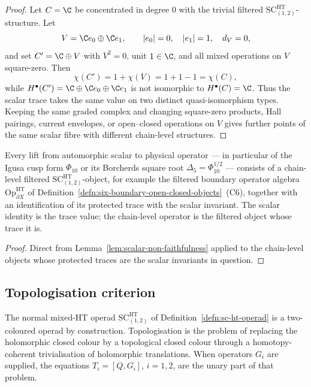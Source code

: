 \begin{proof}
Let \(C=\C\) be concentrated in degree \(0\) with the trivial filtered
\(\mathrm{SC}^{\mathrm{HT}}_{(1,2)}\)-structure.  Let
\[
  V=\C e_0\oplus \C e_1,\qquad |e_0|=0,\quad |e_1|=1,\quad d_V=0,
\]
and set \(C'=\C\oplus V\) with \(V^2=0\), unit \(1\in\C\), and all
mixed operations on \(V\) square-zero.  Then
\[
  \chi(C')=1+\chi(V)=1+1-1=\chi(C),
\]
while \(H^\bullet(C')=\C\oplus \C e_0\oplus \C e_1\) is not
isomorphic to \(H^\bullet(C)=\C\).  Thus the scalar trace takes the
same value on two distinct quasi-isomorphism types.  Keeping the same graded
complex and changing square-zero products, Hall pairings, current
envelopes, or open--closed operations on \(V\) gives further points of
the same scalar fibre with different chain-level structures.
\end{proof}

\begin{cor}
\label{cor:mandatory-chain-supplements}
Every lift from automorphic scalar to physical operator --- in
particular of the Igusa
		cusp form \(\Phi_{10}\) or its Borcherds square root
		\(\Delta_5=\Phi_{10}^{1/2}\) --- consists of a chain-level
filtered \(\mathrm{SC}^{\mathrm{HT}}_{(1,2)}\)-object, for example the
filtered boundary operator algebra
\(\mathrm{Op}^{\mathrm{HT}}_{\partial X}\) of
Definition~\ref{defn:six-boundary-open-closed-objects}~(C6), together with an
identification of its protected trace with the scalar invariant.  The
scalar identity is the trace value; the chain-level operator is the
filtered object whose trace it is.
\end{cor}

\begin{proof}
Direct from Lemma~\ref{lem:scalar-non-faithfulness} applied to the
chain-level objects whose protected traces are the
scalar invariants in question.
\end{proof}

\subsection{Topologisation criterion}
\label{ssec:topologisation}

The normal mixed-HT operad \(\mathrm{SC}^{\mathrm{HT}}_{(1,2)}\) of
Definition~\ref{defn:sc-ht-operad} is a two-coloured operad by
construction.  Topologisation is the problem of replacing the
holomorphic closed colour by a topological closed colour through a
homotopy-coherent trivialisation of holomorphic translations.  When
operators \(G_i\) are supplied, the equations \(T_i=[Q,G_i]\),
\(i=1,2\), are the unary part of that problem.

